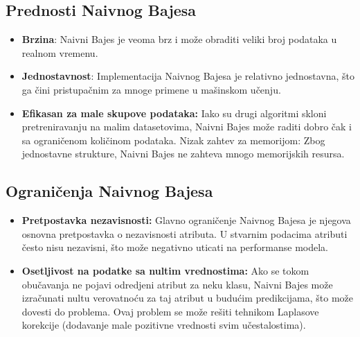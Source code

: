 \documentclass{article}
\begin{document}
\subsection{Prednosti Naivnog Bajesa}
\begin{itemize}
    \item \textbf{Brzina}: Naivni Bajes je veoma brz i može obraditi veliki broj podataka u realnom vremenu. 
    \item \textbf{Jednostavnost}: Implementacija Naivnog Bajesa je relativno jednostavna, što ga čini pristupačnim za mnoge primene u mašinskom učenju.
    \item \textbf{Efikasan za male skupove podataka:} Iako su drugi algoritmi skloni pretreniravanju na malim datasetovima, Naivni Bajes može raditi dobro čak i sa ograničenom količinom podataka.
    Nizak zahtev za memorijom: Zbog jednostavne strukture, Naivni Bajes ne zahteva mnogo memorijskih resursa.

\end{itemize}
    
\newpage
\subsection{Ograničenja Naivnog Bajesa}
\begin{itemize}
    \item \textbf{Pretpostavka nezavisnosti:} Glavno ograničenje Naivnog Bajesa je njegova osnovna pretpostavka o nezavisnosti atributa. U stvarnim podacima atributi često nisu nezavisni, što može negativno uticati na performanse modela.
    \item \textbf{Osetljivost na podatke sa nultim vrednostima:} Ako se tokom obučavanja ne pojavi odredjeni atribut za neku klasu, Naivni Bajes može izračunati nultu verovatnoću za taj atribut u budućim predikcijama, što može dovesti do problema. Ovaj problem se može rešiti tehnikom Laplasove korekcije (dodavanje male pozitivne vrednosti svim učestalostima).
\end{itemize}
\end{document}
